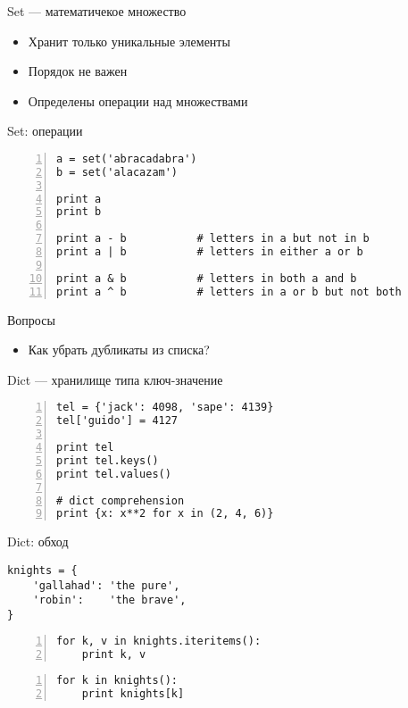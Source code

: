 \documentclass[hyperref={pdftex,unicode}]{beamer}
\begin{document}
\begin{frame}{Set --- математичекое множество} 
  \begin{itemize}
  \item Хранит только уникальные элементы
  \item Порядок не важен
  \item Определены операции над множествами
  \end{itemize}
\end{frame}

\begin{frame}[fragile]{Set: операции}
\begin{lstlisting}[basicstyle=\footnotesize\ttfamily,numbers=left]
a = set('abracadabra')
b = set('alacazam')

print a
print b

print a - b           # letters in a but not in b
print a | b           # letters in either a or b
           
print a & b           # letters in both a and b
print a ^ b           # letters in a or b but not both
\end{lstlisting}
\end{frame}

\begin{frame}{Вопросы}
  \begin{itemize}
  \item Как убрать дубликаты из списка?
  \end{itemize}
\end{frame}

\begin{frame}[fragile]{Dict --- хранилище типа ключ-значение}
  \begin{lstlisting}[basicstyle=\footnotesize\ttfamily,numbers=left]
tel = {'jack': 4098, 'sape': 4139}
tel['guido'] = 4127

print tel
print tel.keys()
print tel.values()

# dict comprehension
print {x: x**2 for x in (2, 4, 6)}
  \end{lstlisting}
\end{frame}

\begin{frame}[fragile]{Dict: обход}
  \begin{lstlisting}[basicstyle=\footnotesize\ttfamily,numbers=none]
knights = {
    'gallahad': 'the pure',
    'robin':    'the brave',
}
  \end{lstlisting}
  \begin{minipage}{0.58\linewidth}
    \begin{lstlisting}[basicstyle=\footnotesize\ttfamily,numbers=left]
for k, v in knights.iteritems():
    print k, v
    \end{lstlisting}
  \end{minipage}
  \hfill
  \begin{minipage}{0.36\linewidth}
    \begin{lstlisting}[basicstyle=\footnotesize\ttfamily,numbers=left]
for k in knights():
    print knights[k]
    \end{lstlisting}
  \end{minipage}
\end{frame}
\end{document}
